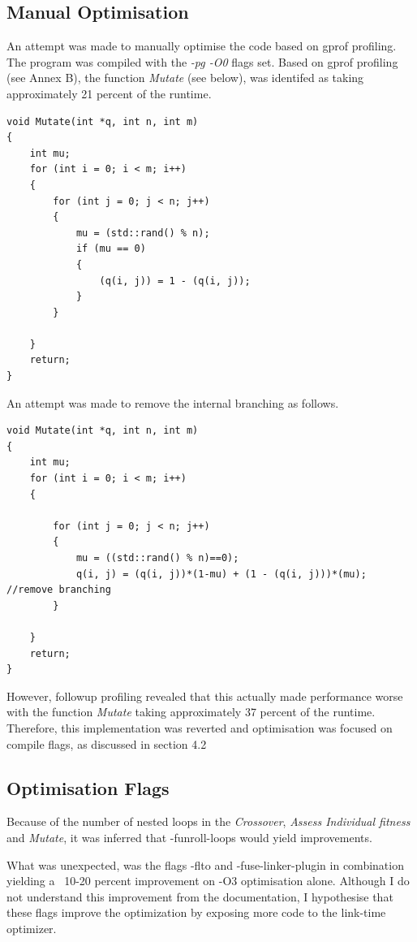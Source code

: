 \documentclass{article}
\begin{document}
\subsection{Manual Optimisation}
An attempt was made to manually optimise the code based on gprof profiling. The program was compiled with the \textit{-pg -O0} flags set. Based on gprof profiling (see Annex B), the function \textit{Mutate} (see below), was identifed as taking approximately 21 percent of the runtime. 
\begin{lstlisting}
void Mutate(int *q, int n, int m)
{
    int mu;
    for (int i = 0; i < m; i++)
    {
        for (int j = 0; j < n; j++)
        {
            mu = (std::rand() % n);
            if (mu == 0)
            {
                (q(i, j)) = 1 - (q(i, j));
            }
        }

    }
    return;
}
\end{lstlisting}
An attempt was made to remove the internal branching as follows. 
\begin{lstlisting}
void Mutate(int *q, int n, int m)
{
    int mu;
    for (int i = 0; i < m; i++)
    {
        
        for (int j = 0; j < n; j++)
        {
            mu = ((std::rand() % n)==0);
            q(i, j) = (q(i, j))*(1-mu) + (1 - (q(i, j)))*(mu); //remove branching
        }

    }
    return;
}
\end{lstlisting}
However, followup profiling revealed that this actually made performance worse with the function \textit{Mutate} taking approximately 37 percent of the runtime. Therefore, this implementation was reverted and optimisation was focused on compile flags, as discussed in section 4.2


\subsection{Optimisation Flags}
Because of the number of nested loops in the \textit{Crossover}, \textit{Assess Individual fitness} and \textit{Mutate}, it was inferred that -funroll-loops would yield improvements.

What was unexpected, was the flags -flto and -fuse-linker-plugin in combination yielding a ~10-20 percent improvement on -O3 optimisation alone.  Although I do not  understand this improvement from the documentation, I hypothesise that these flags improve the optimization by exposing more code to the link-time optimizer. 
\end{document}
